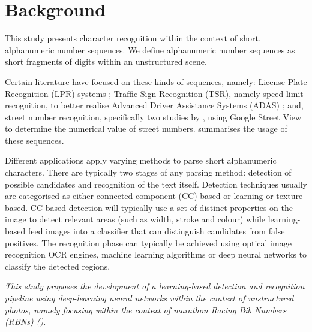 \section{Background}

This study presents character recognition within the context of short, alphanumeric number sequences. We define alphanumeric number sequences as short fragments of digits within an unstructured scene.   

Certain literature have focused on these kinds of sequences, namely: License Plate Recognition (LPR) systems \citep{CanoPerez:2003fq, Anagnostopoulos:2008vu}; Traffic Sign Recognition (TSR), namely speed limit recognition, to better realise Advanced Driver Assistance Systems (ADAS) \citep{Eichner:2008dw,Kundu:2015vq,Seo:2015ez,Lian:2016dc}; and, street number recognition, specifically two studies by \citet{Netzer:2011to}, using Google Street View to determine the numerical value of street numbers.  summarises the usage of these sequences.

Different applications apply varying methods to parse short alphanumeric characters. There are typically two stages of any parsing method: detection of possible candidates and recognition of the text itself. Detection techniques usually are categorised as either connected component (CC)-based or learning or texture-based. CC-based detection will typically use a set of distinct properties on the image to detect relevant areas (such as width, stroke and colour) while learning-based feed images into a classifier that can distinguish candidates from false positives. The recognition phase can typically be achieved using optical image recognition OCR engines, machine learning algorithms or deep neural networks to classify the detected regions.

{
  \itshape
  This study proposes the development of a learning-based detection and recognition pipeline using deep-learning neural networks within the context of unstructured photos, namely focusing within the context of marathon Racing Bib Numbers (RBNs) ().
}
